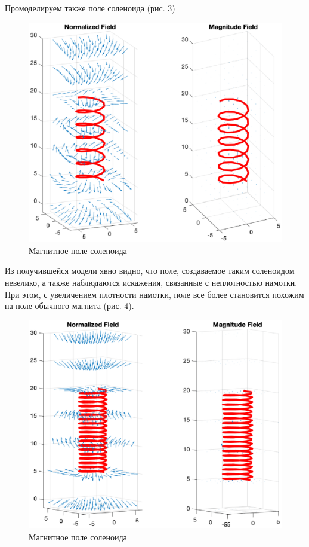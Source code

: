 \documentclass[12pt,a4paper]{article}
\begin{document}
Промоделируем также поле соленоида (рис. 3)
\begin{figure}[H]
    \centering
    \includegraphics[width=\linewidth]{pics/solenoid.eps}
    \caption{Магнитное поле соленоида}
\end{figure}
Из получившейся модели явно видно, что поле, создаваемое таким соленоидом невелико, а также наблюдаются искажения, связанные с неплотностью намотки.
При этом, с увеличением плотности намотки, поле все более становится похожим на поле обычного магнита (рис. 4).
\begin{figure}[H]
    \centering
    \includegraphics[width=\linewidth]{pics/solenoid2.eps}
    \caption{Магнитное поле соленоида}
\end{figure}
\end{document}

